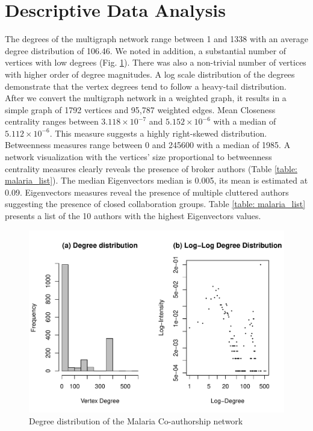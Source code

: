 \section{Descriptive Data Analysis}
\label{sec:malaria_descstat}
The degrees of the multigraph network range between 1 and 1338 with an average degree distribution of 106.46. We noted in addition, a substantial number of vertices with low degrees (Fig. \ref{malaria_fig1}). There was also a non-trivial number of vertices with higher order of degree magnitudes. A log scale distribution of the degrees demonstrate that the vertex degrees tend to follow a heavy-tail distribution.\\
After we convert the multigraph network in a weighted graph, it results in a simple graph of 1792 vertices and 95,787 weighted edges. Mean Closeness centrality ranges between $3.118\times 10^{-7}$ and $5.152\times 10^{-6}$ with a median of $5.112\times 10^{-6}$. This measure  suggests a highly right-skewed distribution. Betweenness measures range between 0 and 245600 with a median of 1985. A network visualization with the vertices' size proportional to betweenness centrality measures clearly reveals the presence of broker authors (Table \ref{table: malaria_list}). The median Eigenvectors median is 0.005, its  mean is estimated at 0.09. Eigenvectors measures reveal the presence of multiple cluttered authors suggesting the presence of closed collaboration groups. Table \ref{table: malaria_list} presents a list of the 10 authors with the highest Eigenvectors values.

\begin{figure}[!ht]
\centering
\includegraphics[scale=0.75]{Chapters/malaria/degreeDistribution}
\caption{Degree distribution of the Malaria Co-authorship network}
\label{malaria_fig1}
\end{figure}

